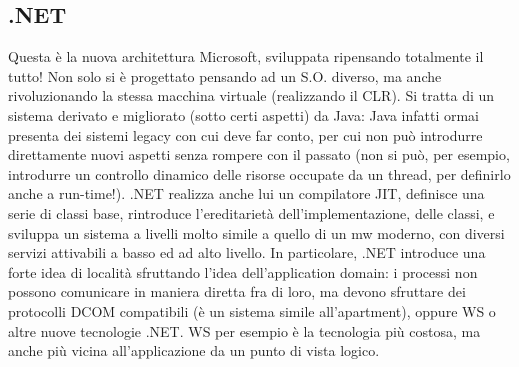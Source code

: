\subsection{.NET}
Questa è la nuova architettura Microsoft, sviluppata ripensando totalmente il tutto! Non solo si è progettato pensando
ad un S.O. diverso, ma anche rivoluzionando la stessa macchina virtuale (realizzando il CLR). Si tratta di un sistema
derivato e migliorato (sotto certi aspetti) da Java: Java infatti ormai presenta dei sistemi legacy con cui deve far
conto, per cui non può introdurre direttamente nuovi aspetti senza rompere con il passato (non si può, per esempio,
introdurre un controllo dinamico delle risorse occupate da un thread, per definirlo anche a run-time!). .NET realizza
anche lui un compilatore JIT, definisce una serie di classi base, rintroduce l'ereditarietà dell'implementazione, delle
classi, e sviluppa un sistema a livelli molto simile a quello di un mw moderno, con diversi servizi attivabili a basso
ed ad alto livello.
In particolare, .NET introduce una forte idea di località sfruttando l'idea dell'application domain: i processi non
possono comunicare in maniera diretta fra di loro, ma devono sfruttare dei protocolli DCOM compatibili (è un sistema
simile all'apartment), oppure WS o altre nuove tecnologie .NET. WS per esempio è la tecnologia più costosa, ma anche più
vicina all'applicazione da un punto di vista logico.
